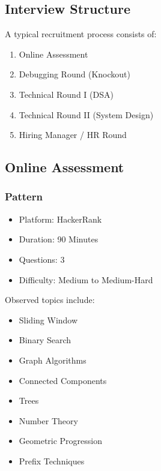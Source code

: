 \documentclass[11pt,a4paper]{article}
\begin{document}

\subsection{Interview Structure}

A typical recruitment process consists of:

\begin{enumerate}
	\item Online Assessment
	\item Debugging Round (Knockout)
	\item Technical Round I (DSA)
	\item Technical Round II (System Design)
	\item Hiring Manager / HR Round
\end{enumerate}


\subsection{Online Assessment}

\subsubsection{Pattern}

\begin{itemize}
	\item Platform: HackerRank
	\item Duration: 90 Minutes
	\item Questions: 3
	\item Difficulty: Medium to Medium-Hard
\end{itemize}

Observed topics include:

\begin{itemize}
	\item Sliding Window
	\item Binary Search
	\item Graph Algorithms
	\item Connected Components
	\item Trees
	\item Number Theory
	\item Geometric Progression
	\item Prefix Techniques
\end{itemize}
\end{document}
